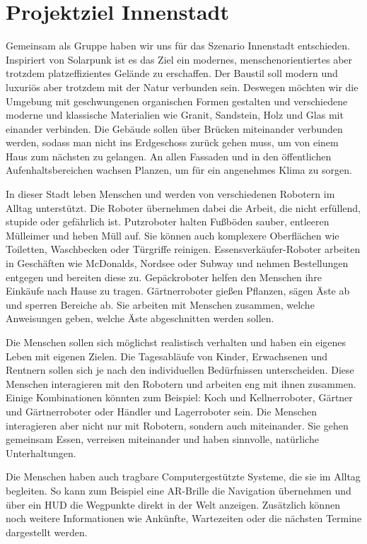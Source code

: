 
\section{Projektziel Innenstadt}

Gemeinsam als Gruppe haben wir uns für das Szenario Innenstadt entschieden. Inspiriert von Solarpunk ist es das Ziel ein modernes, menschenorientiertes aber trotzdem platzeffizientes Gelände zu erschaffen. Der Baustil soll modern und luxuriös aber trotzdem mit der Natur verbunden sein. Deswegen möchten wir die Umgebung mit geschwungenen organischen Formen gestalten und verschiedene moderne und klassische Materialien wie Granit, Sandstein, Holz und Glas mit einander verbinden. Die Gebäude sollen über Brücken miteinander verbunden werden, sodass man nicht ins Erdgeschoss zurück gehen muss, um von einem Haus zum nächsten zu gelangen. An allen Fassaden und in den öffentlichen Aufenhaltsbereichen wachsen Planzen, um für ein angenehmes Klima zu sorgen.

In dieser Stadt leben Menschen und werden von verschiedenen Robotern im Alltag unterstützt. Die Roboter übernehmen dabei die Arbeit, die nicht erfüllend, stupide oder gefährlich ist. Putzroboter halten Fußböden sauber, entleeren Mülleimer und heben Müll auf. Sie können auch komplexere Oberflächen wie Toiletten, Waschbecken oder Türgriffe reinigen. Essensverkäufer-Roboter arbeiten in Geschäften wie McDonalds, Nordsee oder Subway und nehmen Bestellungen entgegen und bereiten diese zu. Gepäckroboter helfen den Menschen ihre Einkäufe nach Hause zu tragen. Gärtnerroboter gießen Pflanzen, sägen Äste ab und sperren Bereiche ab. Sie arbeiten mit Menschen zusammen, welche Anweisungen geben, welche Äste abgeschnitten werden sollen. 

Die Menschen sollen sich möglichst realistisch verhalten und haben ein eigenes Leben mit eigenen Zielen. Die Tagesabläufe von Kinder, Erwachsenen und Rentnern sollen sich je nach den individuellen Bedürfnissen unterscheiden. Diese Menschen interagieren mit den Robotern und arbeiten eng mit ihnen zusammen. Einige Kombinationen könnten zum Beispiel: Koch und Kellnerroboter, Gärtner und Gärtnerroboter oder Händler und Lagerroboter sein. Die Menschen interagieren aber nicht nur mit Robotern, sondern auch miteinander. Sie gehen gemeinsam Essen, verreisen miteinander und haben sinnvolle, natürliche Unterhaltungen.

Die Menschen haben auch tragbare Computergestützte Systeme, die sie im Alltag begleiten. So kann zum Beispiel eine AR-Brille die Navigation übernehmen und über ein HUD die Wegpunkte direkt in der Welt anzeigen. Zusätzlich können noch weitere Informationen wie Ankünfte, Wartezeiten oder die nächsten Termine dargestellt werden.


